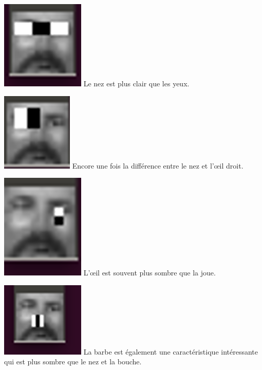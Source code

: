 \documentclass[12pt,a4paper]{article}
\begin{document}
\vspace{0.8cm}
\includegraphics[scale=.5]{Pictures/feature4.png}
\newline
Le nez est plus clair que les yeux.

\vspace{0.8cm}
\includegraphics[scale=.5]{Pictures/feature3.png}
\newline
Encore une fois la différence entre le nez et l'œil droit.

\vspace{0.8cm}
\includegraphics[scale=.5]{Pictures/feature2.png}
\newline
L'œil est souvent plus sombre que la joue.

\vspace{0.8cm}
\includegraphics[scale=.5]{Pictures/feature1.png}
\newline
La barbe est également une caractéristique intéressante qui est plus sombre que le nez et la bouche.
\end{document}
